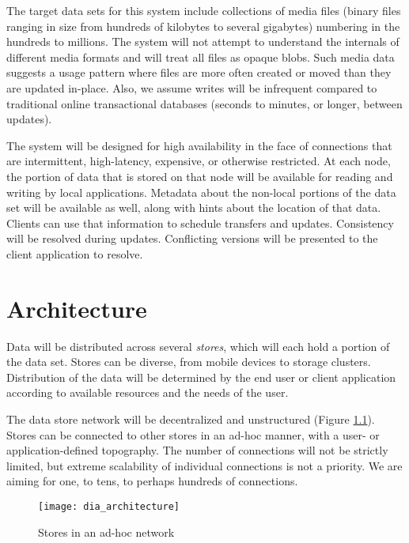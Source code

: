 \documentclass[12pt,a4paper,two-side]{book}
\newcommand{\newterm}{\textit}
\begin{document}
The target data sets for this system include collections of media files (binary
files ranging in size from hundreds of kilobytes to several gigabytes) numbering
in the hundreds to millions. The system will not attempt to understand the
internals of different media formats and will treat all files as opaque blobs.
Such media data suggests a usage pattern where files are more often created or
moved than they are updated in-place. Also, we assume writes will be infrequent
compared to traditional online transactional databases (seconds to minutes, or
longer, between updates).

The system will be designed for high availability in the face of connections
that are intermittent, high-latency, expensive, or otherwise restricted. At each
node, the portion of data that is stored on that node will be available for
reading and writing by local applications. Metadata about the non-local portions
of the data set will be available as well, along with hints about the location
of that data. Clients can use that information to schedule transfers and
updates. Consistency will be resolved during updates. Conflicting versions will
be presented to the client application to resolve.









\chapter{Architecture}

Data will be distributed across several \newterm{stores}, which will each hold a
portion of the data set. Stores can be diverse, from mobile devices to storage
clusters. Distribution of the data will be determined by the end user or client
application according to available resources and the needs of the user.

The data store network will be decentralized and unstructured (Figure
\ref{fig:dia_architecture}). Stores can be connected to other stores in an ad-hoc
manner, with a user- or application-defined topography. The number of
connections will not be strictly limited, but extreme scalability of individual
connections is not a priority. We are aiming for one, to tens, to perhaps
hundreds of connections.

\begin{figure}[h]
  \caption{Stores in an ad-hoc network}
  \label{fig:dia_architecture}
  \centering
    \texttt{[image: dia\_architecture]}
\end{figure}
\end{document}
